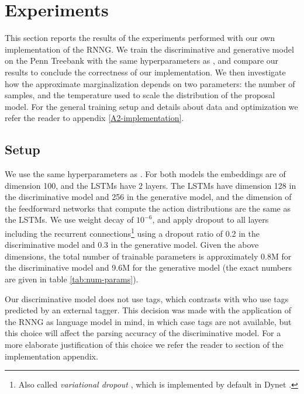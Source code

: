\section{Experiments}
  This section reports the results of the experiments performed with our own implementation of the RNNG. We train the discriminative and generative model on the Penn Treebank with the same hyperparameters as \citet{dyer2016rnng}, and compare our results to conclude the correctness of our implementation. We then investigate how the approximate marginalization depends on two parameters: the number of samples, and the temperature used to scale the distribution of the proposal model. For the general training setup and details about data and optimization we refer the reader to appendix \ref{A2-implementation}.

  \subsection{Setup}
    We use the same hyperparameters as \citep{dyer2016rnng}. For both models the embeddings are of dimension 100, and the LSTMs have 2 layers. The LSTMs have dimension 128 in the discriminative model and 256 in the generative model, and the dimension of the feedforward networks that compute the action distributions are the same as the LSTMs. We use weight decay of $10^{-6}$, and apply dropout to all layers including the recurrent connections\footnote{Also called \textit{variational dropout} \citep{gal2016theoretically}, which is implemented by default in Dynet \citep{neubig2017dynet}.} using a dropout ratio of 0.2 in the discriminative model and 0.3 in the generative model. Given the above dimensions, the total number of trainable parameters is approximately 0.8M for the discriminative model and 9.6M for the generative model (the exact numbers are given in table \ref{tab:num-params}).

    Our discriminative model does not use tags, which contrasts with \citet{dyer2016rnng} who use tags predicted by an external tagger. This decision was made with the application of the RNNG as language model in mind, in which case tags are not available, but this choice will affect the parsing accuracy of the discriminative model. For a more elaborate justification of this choice we refer the reader to section \label{sec:impl-embedding} of the implementation appendix.


